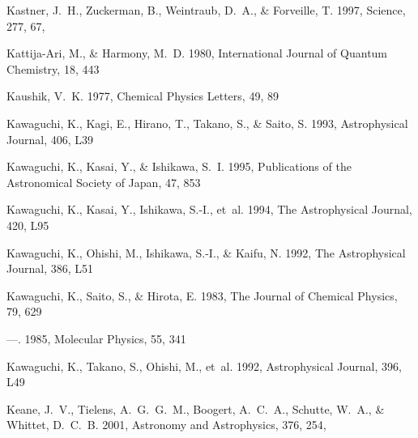 \documentclass[twocolumn]{aastex631}
\begin{document}
\begin{thebibliography}{}
{Kastner}, J.~H., {Zuckerman}, B., {Weintraub}, D.~A., \& {Forveille}, T. 1997,
  Science, 277, 67, 

Kattija-Ari, M., \& Harmony, M.~D. 1980, International Journal of Quantum
  Chemistry, 18, 443

Kaushik, V.~K. 1977, Chemical Physics Letters, 49, 89

Kawaguchi, K., Kagi, E., Hirano, T., Takano, S., \& Saito, S. 1993,
  Astrophysical Journal, 406, L39

Kawaguchi, K., Kasai, Y., \& Ishikawa, S.~I. 1995, Publications of the
  Astronomical Society of Japan, 47, 853

Kawaguchi, K., Kasai, Y., Ishikawa, S.-I., {et~al.} 1994, The Astrophysical
  Journal, 420, L95

Kawaguchi, K., Ohishi, M., Ishikawa, S.-I., \& Kaifu, N. 1992{},
  The Astrophysical Journal, 386, L51

Kawaguchi, K., Saito, S., \& Hirota, E. 1983, The Journal of Chemical Physics,
  79, 629

---. 1985, Molecular Physics, 55, 341

Kawaguchi, K., Takano, S., Ohishi, M., {et~al.} 1992{},
  Astrophysical Journal, 396, L49

{Keane}, J.~V., {Tielens}, A.~G.~G.~M., {Boogert}, A.~C.~A., {Schutte}, W.~A.,
  \& {Whittet}, D.~C.~B. 2001, Astronomy and Astrophysics, 376, 254,


\end{thebibliography}
\end{document}
